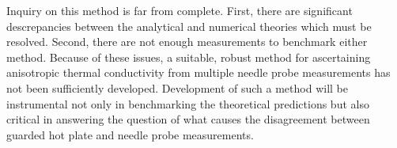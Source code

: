Inquiry on this method is far from complete. First, there are significant
descrepancies between the analytical and numerical theories which must be resolved.
Second, there are not enough measurements to benchmark either method. Because
of these issues, a suitable, robust method for ascertaining anisotropic thermal
conductivity from multiple needle probe measurements has not been sufficiently
developed. Development of such a method will be instrumental not only in
benchmarking the theoretical predictions but also critical in answering the
question of what causes the disagreement between guarded hot plate and
needle probe measurements.
